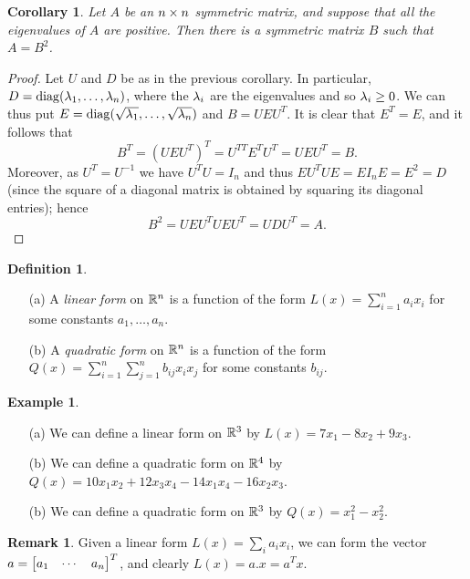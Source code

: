 \documentclass[reqno]{amsart}
\newtheorem{corollary}[theorem]{Corollary}
\theoremstyle{definition}
\newtheorem{remark}[theorem]{Remark}
\newtheorem{definition}[theorem]{Definition}
\newtheorem{example}[theorem]{Example}
\newcommand{\dfn}[1]{\emph{{#1}}\index{#1}}
\begin{document}
\begin{corollary}\label{cor-square-root}
 Let $A$ be an $n\times n$ symmetric matrix, and suppose that all the
 eigenvalues of $A$ are positive.  Then there is a symmetric matrix
 $B$ such that $A=B^2$.
\end{corollary}
\begin{proof}
 Let $U$ and $D$ be as in the previous corollary.  In particular,
 $D=\operatorname{diag}(\lambda_1,\dotsc,\lambda_n)$, where the $\lambda_i$ are the eigenvalues
 and so $\lambda_i\geq 0$.  We can thus put
 $E=\operatorname{diag}(\sqrt{\lambda_1},\dotsc,\sqrt{\lambda_n})$ and $B=UEU^T$.  It is
 clear that $E^T=E$, and it follows that 
 \[ B^T = (UEU^T)^T = U^{TT}E^TU^T = UEU^T = B. \]
 Moreover, as $U^T=U^{-1}$ we have $U^TU=I_n$ and
 thus $E U^T U E = E I_n E = E^2 = D$ (since the square of a
 diagonal matrix is obtained by squaring its diagonal entries); hence
 \[ B^2 = UEU^TUEU^T = UDU^T = A. \]
\end{proof}

\begin{definition}\label{defn-forms}
 \begin{itemize}
  \item[(a)] A \dfn{linear form} on ${\mathbb{R}}^n$ is a function of the form
   $L(x)=\sum_{i=1}^n a_ix_i$ for some constants
   $a_1,\dotsc,a_n$. 
  \item[(b)] A \dfn{quadratic form} on ${\mathbb{R}}^n$ is a function of the
   form $Q(x)=\sum_{i=1}^n\sum_{j=1}^nb_{ij}x_ix_j$ for
   some constants $b_{ij}$. 
 \end{itemize}
\end{definition}

\begin{example}\label{eg-forms}
 \begin{itemize}
  \item[(a)] We can define a linear form on ${\mathbb{R}}^3$ by
   $L(x)=7x_1-8x_2+9x_3$. 
  \item[(b)] We can define a quadratic form on ${\mathbb{R}}^4$ by 
   $Q(x)=10 x_1x_2 + 12 x_3x_4 - 14 x_1x_4 - 16 x_2x_3$.
  \item[(b)] We can define a quadratic form on ${\mathbb{R}}^3$ by 
   $Q(x)= x_1^2 - x_2^2$.
 \end{itemize}
\end{example}

\begin{remark}
 Given a linear form $L(x)=\sum_ia_ix_i$, we can form the vector
 $a=\left[\begin{matrix} a_1 & \cdots & a_n\end{matrix}\right]^T$, and clearly $L(x)=a.x=a^Tx$.  
\end{remark}
\end{document}
